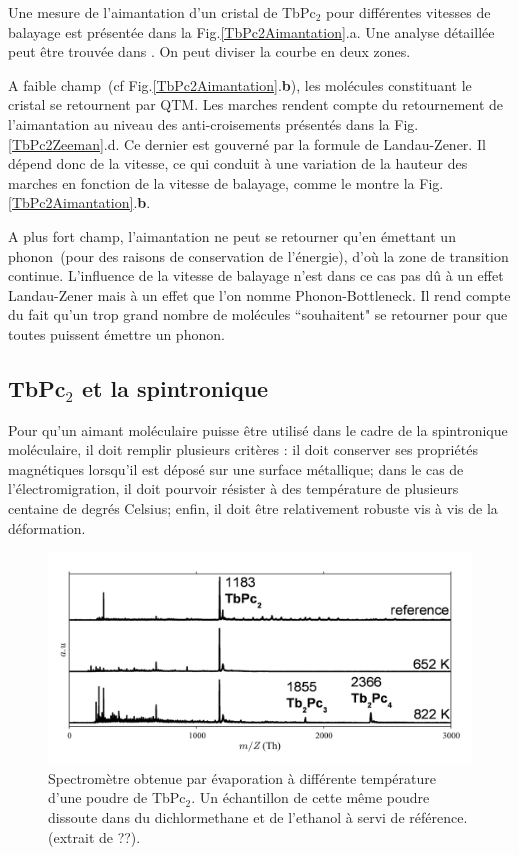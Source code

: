 Une mesure de l'aimantation d'un cristal de TbPc$_2$ pour différentes vitesses de balayage est présentée dans la Fig.\ref{TbPc2Aimantation}.a. Une analyse détaillée peut \^etre trouvée dans \cite{Ishikawa2005}. On peut diviser la courbe en deux zones. 

A faible champ~(cf Fig.\ref{TbPc2Aimantation}.\textbf{b}), les molécules constituant le cristal se retournent par QTM. Les marches rendent compte du retournement de l'aimantation au niveau des anti-croisements présentés dans la Fig.\ref{TbPc2Zeeman}.d. Ce dernier est gouverné par la formule de Landau-Zener. Il dépend donc de la vitesse, ce qui conduit à une variation de la hauteur des marches en fonction de la vitesse de balayage, comme le montre la Fig.\ref{TbPc2Aimantation}.\textbf{b}. 

A plus fort champ, l'aimantation ne peut se retourner qu'en émettant un phonon~(pour des raisons de conservation de l'énergie), d'où la zone de transition continue. L'influence de la vitesse de balayage n'est dans ce cas pas d\^u à un effet Landau-Zener mais à un effet que l'on nomme Phonon-Bottleneck. Il rend compte du fait qu'un trop grand nombre de molécules ``souhaitent" se retourner pour que toutes puissent émettre un phonon.

\subsection{TbPc$_2$ et la spintronique}
Pour qu'un aimant moléculaire puisse être utilisé dans le cadre de la spintronique moléculaire, il doit remplir plusieurs critères : il doit conserver ses propriétés magnétiques lorsqu'il est déposé sur une surface métallique; dans le cas de l'électromigration, il doit pourvoir résister à des température de plusieurs centaine de degrés Celsius; enfin, il doit être relativement robuste vis à vis de la déformation.

\begin{figure}
\centering \includegraphics[scale=0.45]{Resultats/TbPcResTemp/TbPcResTemp.pdf} 
\caption{Spectromètre obtenue par évaporation à différente température d'une poudre de TbPc$_2$. Un échantillon de cette même poudre dissoute dans du dichlormethane et de l'ethanol à servi de référence. (extrait de ??).}
\label{SpectMass}
\end{figure}

